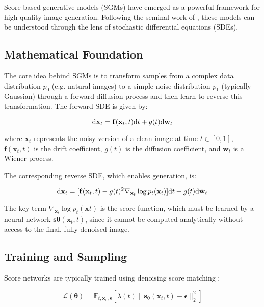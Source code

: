 Score-based generative models (SGMs) have emerged as a powerful framework for high-quality image generation. Following the seminal work of \citep{song2021scorebasedgenerativemodelingstochastic}, these models can be understood through the lens of stochastic differential equations (SDEs).

\subsection{Mathematical Foundation}

The core idea behind SGMs is to transform samples from a complex data distribution $p_0$ (e.g. natural images) to a simple noise distribution $p_1$ (typically Gaussian) through a forward diffusion process and then learn to reverse this transformation. The forward SDE is given by:

\begin{equation}
\mathrm{d} \mathbf{x}_t = \mathbf{f}(\mathbf{x}_t, t) \mathrm{d} t + g(t) \mathrm{d} \mathbf{w}_t
\label{eq:forward_sde}
\end{equation}

where $\mathbf{x}_t$ represents the noisy version of a clean image at time $t \in [0, 1]$, $\mathbf{f}(\mathbf{x}_t, t)$ is the drift coefficient, $g(t)$ is the diffusion coefficient, and $\mathbf{w}_t$ is a Wiener process.

The corresponding reverse SDE, which enables generation, is:

\begin{equation}
\mathrm{d} \mathbf{x}_t = [\mathbf{f}(\mathbf{x}_t, t) - g(t)^2 \nabla_{\mathbf{x}_t} \log p_t(\mathbf{x}_t)] \mathrm{d} t + g(t) \mathrm{d} \bar{\mathbf{w}}_t
\label{eq:reverse_sde}
\end{equation}

The key term $\nabla_{\mathbf{x}_t} \log p_t(\mathbf{x}t)$ is the score function, which must be learned by a neural network $\mathbf{s}{\boldsymbol{\theta}}(\mathbf{x}_t, t)$, since it cannot be computed analytically without access to the final, fully denoised image.

\subsection{Training and Sampling}

Score networks are typically trained using denoising score matching \citep{6795935, song2020generativemodelingestimatinggradients}:

\begin{equation}
\mathcal{L}(\boldsymbol{\theta}) = \mathbb{E}_{t, \mathbf{x}_0, \boldsymbol{\epsilon}} \left[ \lambda(t) \|\mathbf{s}_{\boldsymbol{\theta}}(\mathbf{x}_t, t) - \boldsymbol{\epsilon}\|_2^2 \right]
\label{eq:score_matching_loss}
\end{equation}

